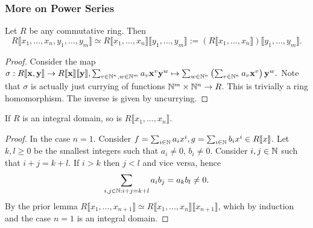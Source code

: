 \subsubsection{More on Power Series}
\begin{lemma}
    Let $R$ be any commutative ring. Then $$R\llbracket x_1,\dots,x_n,y_1,\dots,y_m \rrbracket\simeq R\llbracket x_1,\dots,x_n\rrbracket\llbracket y_1,\dots,y_m\rrbracket := (R\llbracket x_1,\dots,x_n\rrbracket)\llbracket y_1,\dots,y_m\rrbracket.$$
\end{lemma}
\begin{proof}
    Consider the map $\sigma : R\llbracket \mathbf{x},\mathbf{y}\rrbracket \rightarrow R\llbracket \mathbf{x}\rrbracket\llbracket \mathbf{y}\rrbracket, \sum_{v\in \mathbb{N}^n,w\in \mathbb{N}^m} a_v\mathbf{x}^v\mathbf{y}^w\mapsto \sum_{w\in \mathbb{N}^n}\left(\sum_{v\in \mathbb{N}^n} a_v\mathbf{x}^v\right)\mathbf{y}^w.$
    Note that $\sigma$ is actually just currying of functions $\mathbb{N}^m\times \mathbb{N}^n \rightarrow R$. This is trivially a ring homomorphism. The inverse is given by uncurrying. 
\end{proof}
\begin{lemma}
    If $R$ is an integral domain, so is $R\llbracket x_1,\dots,x_n \rrbracket$. 
\end{lemma}
\begin{proof}
    In the case $n=1$. Consider $f=\sum_{i\in \mathbb{N}} a_ix^i ,g=\sum_{i\in\mathbb{N}} b_ix^i \in R\llbracket x\rrbracket$. Let $k,l\geq 0$ be the smallest integers such that $a_i\neq 0$, $b_i\neq 0$. Consider $i,j\in \mathbb{N}$ such that $i+j=k+l$. If $i>k$ then $j<l$ and vice versa, hence  
    $$\sum_{i,j\in \mathbb{N} : i+j=k+l} a_ib_j = a_kb_l\neq 0.$$
    By the prior lemma $R\llbracket x_1,\dots,x_{n+1}\rrbracket \simeq R\llbracket x_1,\dots,x_n\rrbracket\llbracket x_{n+1}\rrbracket$, which by induction and the case $n=1$ is an integral domain. 
\end{proof}
